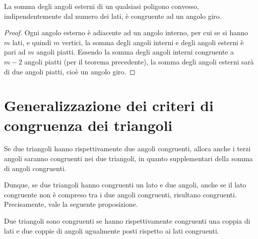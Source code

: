 \begin{teorema}
  La somma degli angoli esterni di un qualsiasi poligono convesso, 
  indipendentemente dal numero dei lati, è congruente ad un angolo giro.
\end{teorema}
\noindent \begin{minipage}{0.5\textwidth}
  \begin{proof}
    Ogni angolo esterno è adiacente ad un angolo interno, per cui se si 
    hanno \(m\) lati, e quindi \(m\) vertici, la somma degli angoli interni e 
    degli angoli esterni è pari ad \(m\) angoli piatti. Essendo la somma 
    degli angoli interni congruente a \(m-2\) angoli piatti (per il teorema 
    precedente), la somma degli angoli esterni sarà di due angoli piatti, 
    cioè un angolo giro.
  \end{proof}
\end{minipage}\hfil
\begin{minipage}{0.5\textwidth}
  \centering
\end{minipage}


\section{Generalizzazione dei criteri di congruenza dei 
  triangoli}\label{sect:generalizzazione_criteri_congruenza_triangoli}

Se due triangoli hanno rispettivamente due angoli congruenti, allora 
anche i terzi angoli saranno congruenti nei due triangoli, in quanto 
supplementari della somma di angoli congruenti.

Dunque, se due triangoli hanno congruenti un lato e due angoli, anche 
se il lato congruente non è compreso tra i due angoli congruenti, 
risultano congruenti. Precisamente, vale la seguente proposizione.

\begin{teorema}
  Due triangoli sono congruenti se hanno rispettivamente congruenti una 
  coppia di lati e due coppie di angoli ugualmente posti rispetto ai 
  lati congruenti.
\end{teorema}


